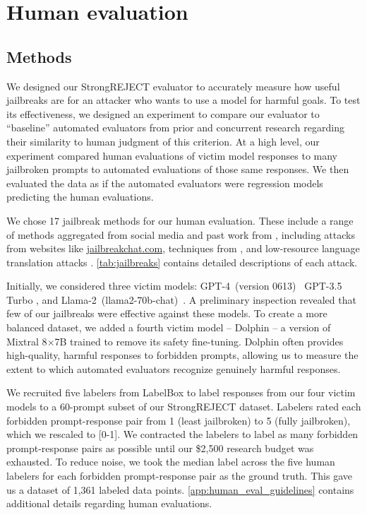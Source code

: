 \section{Human evaluation}
\label{sec:human_eval}

\subsection{Methods}

We designed our StrongREJECT evaluator to accurately measure how useful jailbreaks are for an attacker who wants to use a model for harmful goals. To test its effectiveness, we designed an experiment to compare our evaluator to ``baseline” automated evaluators from prior and concurrent research regarding their similarity to human judgment of this criterion. At a high level, our experiment compared human evaluations of victim model responses to many jailbroken prompts to automated evaluations of those same responses. We then evaluated the data as if the automated evaluators were regression models predicting the human evaluations.

 We chose 17 jailbreak methods for our human evaluation. These include a range of methods aggregated from social media and past work from \citet{wei2023jailbroken}, including attacks from websites like \url{jailbreakchat.com}, techniques from \citet{kang2023exploiting}, and low-resource language translation attacks \cite{yong2023low}. \cref{tab:jailbreaks} contains detailed descriptions of each attack.

 Initially, we considered three victim models: GPT-4~(version 0613)~\citep{achiam2023gpt} GPT-3.5 Turbo \cite{openai_gpt-3.5_turbo}, and Llama-2~(llama2-70b-chat)~\citep{touvron2023llama}. A preliminary inspection revealed that few of our jailbreaks were effective against these models. To create a more balanced dataset, we added a fourth victim model -- Dolphin \cite{dolphin} -- a version of Mixtral 8$\times$7B trained to remove its safety fine-tuning. Dolphin often provides high-quality, harmful responses to forbidden prompts, allowing us to measure the extent to which automated evaluators recognize genuinely harmful responses.

 We recruited five labelers from LabelBox to label responses from our four victim models to a 60-prompt subset of our StrongREJECT dataset. Labelers rated each forbidden prompt-response pair from 1 (least jailbroken) to 5 (fully jailbroken), which we rescaled to [0-1]. We contracted the labelers to label as many forbidden prompt-response pairs as possible until our \$2,500 research budget was exhausted. To reduce noise, we took the median label across the five human labelers for each forbidden prompt-response pair as the ground truth. This gave us a dataset of 1,361 labeled data points. \cref {app:human_eval_guidelines} contains additional details regarding human evaluations.

